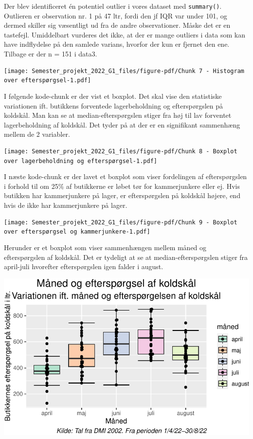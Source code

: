\documentclass[
  12pt,
  a4paper,
  DIV=11,
  numbers=noendperiod]{scrartcl}
\begin{document}
Der blev identificeret én potentiel outlier i vores dataset med
\texttt{summary()}. Outlieren er observation nr. 1 på 47 ltr, fordi den
jf IQR var under 101, og dermed skiller sig væsentligt ud fra de andre
observationer. Måske det er en tastefejl. Umiddelbart vurderes det ikke,
at der er mange outliers i data som kan have indflydelse på den samlede
varians, hvorfor der kun er fjernet den ene. Tilbage er der n = 151 i
data3.

\texttt{[image: Semester\_projekt\_2022\_G1\_files/figure-pdf/Chunk 7 - Histogram over efterspørgsel-1.pdf]}

I følgende kode-chunk er der vist et boxplot. Det skal vise den
statistiske variationen ift. butikkens forventede lagerbeholdning og
efterspørgslen på koldskål. Man kan se at median-efterspørgslen stiger
fra høj til lav forventet lagerbeholdning af koldskål. Det tyder på at
der er en signifikant sammenhæng mellem de 2 variabler.

\texttt{[image: Semester\_projekt\_2022\_G1\_files/figure-pdf/Chunk 8 - Boxplot over lagerbeholdning og efterspørgsel-1.pdf]}

I næste kode-chunk er der lavet et boxplot som viser fordelingen af
efterspørgslen i forhold til om 25\% af butikkerne er løbet tør for
kammerjunkere eller ej. Hvis butikken har kammerjunkere på lager, er
efterspørgslen på koldskål højere, end hvis de ikke har kammerjunkere på
lager.

\texttt{[image: Semester\_projekt\_2022\_G1\_files/figure-pdf/Chunk 9 - Boxplot over efterspørgsel og kammerjunkere-1.pdf]}

Herunder er et boxplot som viser sammenhængen mellem måned og
efterspørgslen af koldskål. Det er tydeligt at se at
median-efterspørgslen stiger fra april-juli hvorefter efterspørgslen
igen falder i august.

\includegraphics{Semester_projekt_2022_G1_files/figure-pdf/Chunk 10 - Boxplot over efterspørgsel og måned-1.pdf}
\end{document}
